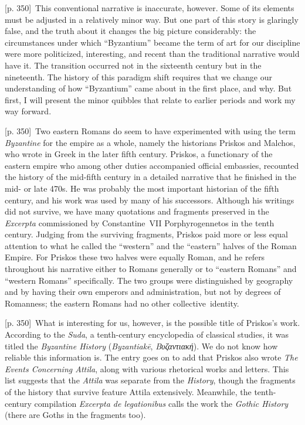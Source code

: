 \documentclass[10pt,a4paper]{article}
\begin{document}
{\scriptsize\color{gray}[p. 350]}\ This conventional narrative is inaccurate, however. Some of its elements must be adjusted in a relatively minor way. But one part of this story is glaringly false, and the truth about it changes the big picture considerably: the circumstances under which “Byzantium” became the term of art for our discipline were more politicized, interesting, and recent than the traditional narrative would have it. The transition occurred not in the sixteenth century but in the nineteenth. The history of this paradigm shift requires that we change our understanding of how “Byzantium” came about in the first place, and why. But first, I will present the minor quibbles that relate to earlier periods and work my way forward.\par
{\scriptsize\color{gray}[p. 350]}\ Two eastern Romans do seem to have experimented with using the term \textit{Byzantine} for the empire as a whole, namely the historians Priskos and Malchos, who wrote in Greek in the later fifth century. Priskos, a functionary of the eastern empire who among other duties accompanied official embassies, recounted the history of the mid-fifth century in a detailed narrative that he finished in the mid- or late 470s. He was probably the most important historian of the fifth century, and his work was used by many of his successors. Although his writings did not survive, we have many quotations and fragments preserved in the \textit{Excerpta} commissioned by Constantine VII Porphyrogennetos in the tenth century. Judging from the surviving fragments, Priskos paid more or less equal attention to what he called the “western” and the “eastern” halves of the Roman Empire. For Priskos these two halves were equally Roman, and he refers throughout his narrative either to Romans generally or to “eastern Romans” and “western Romans” specifically. The two groups were distinguished by geography and by having their own emperors and administration, but not by degrees of Romanness; the eastern Romans had no other collective identity.\par
{\scriptsize\color{gray}[p. 350]}\ What is interesting for us, however, is the possible title of Priskos’s work. According to the \textit{Suda}, a tenth-century encyclopedia of classical studies, it was titled the \textit{Byzantine History} (\textit{Byzantiakē}, \textit{Βυζαντιακή}). We do not know how reliable this information is. The entry goes on to add that Priskos also wrote \textit{The Events Concerning Attila}, along with various rhetorical works and letters. This list suggests that the \textit{Attila} was separate from the \textit{History}, though the fragments of the history that survive feature Attila extensively. Meanwhile, the tenth-century compilation \textit{Excerpta de legationibus} calls the work the \textit{Gothic History} (there are Goths in the fragments too).\par
\end{document}
